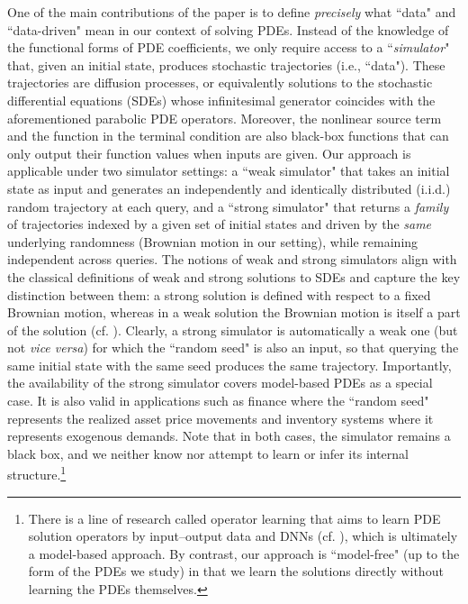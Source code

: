 \documentclass[twoside,11pt]{article}
\newcommand{\1}{\mathbf{1}}
\numberwithin{equation}{section}
\begin{document}
One of the main contributions of the paper is to define {\it precisely} what ``data" and ``data-driven" mean in our context of solving PDEs. Instead of the knowledge of the functional forms of PDE coefficients, we only require
access to a ``\textit{simulator}" that, given an initial state, produces stochastic trajectories (i.e., ``data"). These trajectories are diffusion processes, or equivalently solutions to the stochastic differential equations (SDEs) whose infinitesimal generator coincides with the aforementioned parabolic PDE operators. Moreover, the nonlinear source term and the function in the terminal condition
are also black-box functions that can only output their function values when inputs are given.
Our approach is applicable under two simulator settings: a ``weak simulator" that takes an initial state as input and generates an independently and identically distributed (i.i.d.) random trajectory at each query, and a ``strong simulator" that returns a {\it family} of trajectories indexed by a given set of initial states and driven by the {\it same} underlying randomness (Brownian motion in our setting), while remaining independent across queries. The notions of weak and strong simulators align with the classical definitions of weak and strong solutions to SDEs and capture the key distinction between them: a strong solution is defined with respect to a fixed Brownian motion, whereas in a weak solution the Brownian motion is itself a part of the solution (cf. \citealt[Chapter 5, Definitions 2.1 and 3.1]{karatzas2014brownian}). Clearly,  a strong simulator is automatically a weak one (but not {\it vice versa}) for which the ``random seed" is also an input, so that querying the same initial state with the same seed produces the same trajectory. Importantly, the availability of the strong simulator covers model-based PDEs as a special case. It is also valid in applications such as finance where the ``random seed" represents the realized asset price movements and   inventory systems where it represents exogenous demands. %
Note that in both cases, the simulator remains a black box, and we neither know nor attempt to learn or infer its internal structure.\footnote{There is a line of research called operator learning that aims to learn PDE solution operators by input--output data and DNNs (cf. \citealt{lu2021learning}), which is ultimately a model-based approach. By contrast, our approach is ``model-free" (up to the form of the PDEs we study) in that we learn the solutions directly without learning the PDEs themselves.}
\end{document}
